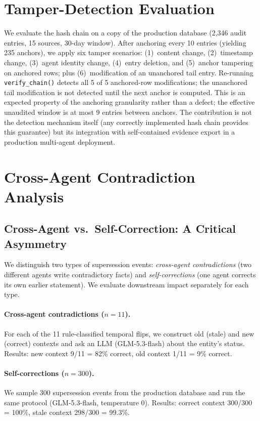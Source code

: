 \documentclass[11pt]{article}
\begin{document}
\section{Tamper-Detection Evaluation}
\label{sec:tamper}

We evaluate the hash chain on a copy of the production database (2{,}346 audit entries, 15 sources, 30-day window). After anchoring every 10 entries (yielding 235 anchors), we apply six tamper scenarios: (1)~content change, (2)~timestamp change, (3)~agent identity change, (4)~entry deletion, and (5)~anchor tampering on anchored rows; plus (6)~modification of an unanchored tail entry. Re-running \texttt{verify\_chain()} detects all 5 of 5 anchored-row modifications; the unanchored tail modification is not detected until the next anchor is computed. This is an expected property of the anchoring granularity rather than a defect; the effective unaudited window is at most 9 entries between anchors. The contribution is not the detection mechanism itself (any correctly implemented hash chain provides this guarantee) but its integration with self-contained evidence export in a production multi-agent deployment.



\section{Cross-Agent Contradiction Analysis}

\subsection{Cross-Agent vs.\ Self-Correction: A Critical Asymmetry}

We distinguish two types of supersession events: \emph{cross-agent contradictions} (two different agents write contradictory facts) and \emph{self-corrections} (one agent corrects its own earlier statement). We evaluate downstream impact separately for each type.

\paragraph{Cross-agent contradictions ($n{=}11$).} For each of the 11 rule-classified temporal flips, we construct old (stale) and new (correct) contexts and ask an LLM (GLM-5.3-flash) about the entity's status. Results: new context 9/11 = 82\% correct, old context 1/11 = 9\% correct.

\paragraph{Self-corrections ($n{=}300$).} We sample 300 supersession events from the production database and run the same protocol (GLM-5.3-flash, temperature 0). Results: correct context 300/300 = 100\%, stale context 298/300 = 99.3\%.
\end{document}
